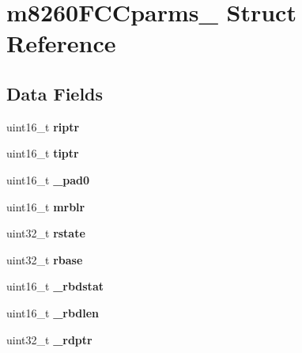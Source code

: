 \hypertarget{structm8260FCCparms__}{}\section{m8260\+F\+C\+Cparms\+\_\+ Struct Reference}
\label{structm8260FCCparms__}
\subsection*{Data Fields}
\begin{DoxyCompactItemize}
\item 
\mbox{\label{structm8260FCCparms___ad641933915a1fa764bdf92a428ad8073}} 
uint16\+\_\+t {\bfseries riptr}
\item 
\mbox{\label{structm8260FCCparms___a31752ddca601e415a5edf2ecdb0a71e4}} 
uint16\+\_\+t {\bfseries tiptr}
\item 
\mbox{\label{structm8260FCCparms___a27318feabdcb03fa2b8f2c566bdce9b3}} 
uint16\+\_\+t {\bfseries \+\_\+pad0}
\item 
\mbox{\label{structm8260FCCparms___a05b280b509c00fe4343bf5a6c52839e9}} 
uint16\+\_\+t {\bfseries mrblr}
\item 
\mbox{\label{structm8260FCCparms___affaf459f7e03b031432fe63c2a8a0800}} 
uint32\+\_\+t {\bfseries rstate}
\item 
\mbox{\label{structm8260FCCparms___a02d6afe8d8d38feeed9359c3c38bcb30}} 
uint32\+\_\+t {\bfseries rbase}
\item 
\mbox{\label{structm8260FCCparms___ac1bceaeddd615cd16e2b89f0a30170e4}} 
uint16\+\_\+t {\bfseries \+\_\+rbdstat}
\item 
\mbox{\label{structm8260FCCparms___aa55b637c5d7e91cbaacf5012c5bece7f}} 
uint16\+\_\+t {\bfseries \+\_\+rbdlen}
\item 
\mbox{\label{structm8260FCCparms___ac4b916c6ebca20b3ac293e958f03b662}} 
uint32\+\_\+t {\bfseries \+\_\+rdptr}
\item 

\end{DoxyCompactItemize}

